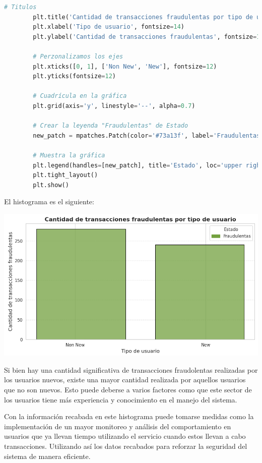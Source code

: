 \documentclass{article}
\begin{document}
\begin{itemize}
\begin{lstlisting}[language=Python, caption=Implementación DES(Data Encryption Standard)]
        # Titulos
        plt.title('Cantidad de transacciones fraudulentas por tipo de usuario', fontsize=16, fontweight='bold')
        plt.xlabel('Tipo de usuario', fontsize=14)
        plt.ylabel('Cantidad de transacciones fraudulentas', fontsize=14)
        
        # Perzonalizamos los ejes
        plt.xticks([0, 1], ['Non New', 'New'], fontsize=12) 
        plt.yticks(fontsize=12)
        
        # Cuadrícula en la gráfica 
        plt.grid(axis='y', linestyle='--', alpha=0.7)
        
        # Crear la leyenda "Fraudulentas" de Estado
        new_patch = mpatches.Patch(color='#73a13f', label='Fraudulentas')
        
        # Muestra la gráfica
        plt.legend(handles=[new_patch], title='Estado', loc='upper right', fontsize=12)
        plt.tight_layout()
        plt.show()
    \end{lstlisting}

    El histograma es el siguiente:

    \begin{center}
        \includegraphics[scale = .4]{IMAGE/Histograma2.png}
    \end{center}

    Si bien hay una cantidad significativa de transacciones fraudolentas realizadas por los usuarios nuevos, existe una mayor cantidad realizada por aquellos usuarios que no son nuevos. Esto puede deberse a varios factores como que este sector de los usuarios tiene más experiencia y conocimiento en el manejo del sistema.

    Con la información recabada en este histograma puede tomarse medidas como la implementación de un mayor monitoreo y análisis del comportamiento en usuarios que ya llevan tiempo utilizando el servicio cuando estos llevan a cabo transacciones. Utilizando así los datos recabados para reforzar la seguridad del sistema de manera eficiente.


\end{itemize}
\end{document}
